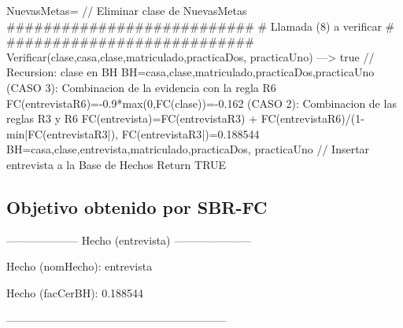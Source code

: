 \begin{listing}[language=Pascal]
	NuevasMetas={} // Eliminar clase de NuevasMetas
  ###########################
  # Llamada (8) a verificar #
  ###########################
	Verificar(clase,{casa,clase,matriculado,practicaDos,
	practicaUno}) ---> true // Recursion: clase en BH
	BH={casa,clase,matriculado,practicaDos,practicaUno}
	(CASO 3): Combinacion de la evidencia con la regla R6
	 FC(entrevista{R6})=-0.9*max(0,FC(clase))=-0.162
	(CASO 2): Combinacion de las reglas R3 y R6
	 FC(entrevista)=FC(entrevista{R3}) + FC(entrevista{R6})/(1-min{|FC(entrevista{R3}|), FC(entrevista{R3}|})=0.188544
	BH={casa,clase,entrevista,matriculado,practicaDos,
	practicaUno} // Insertar entrevista a la Base de Hechos
Return TRUE
\end{listing}

\subsection{Objetivo obtenido por SBR-FC}
\begin{center}
\par -------------------- Hecho (entrevista) ---------------------
\par Hecho (nomHecho): entrevista
\par Hecho (facCerBH): 0.188544
\par ------------------------------------------------------------
\end{center}
